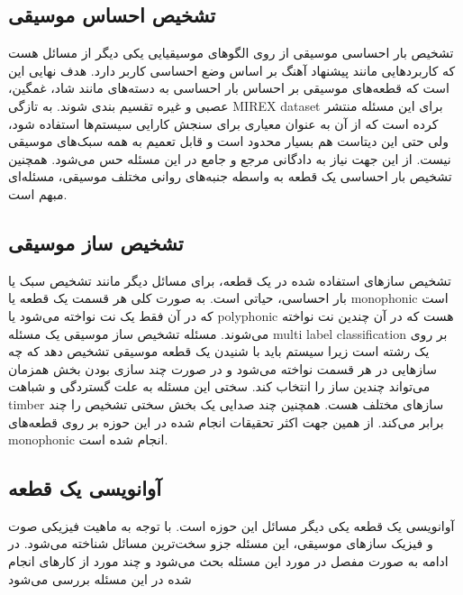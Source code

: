 \subsection{تشخیص احساس موسیقی}
تشخیص بار احساسی موسیقی از روی الگوهای موسیقیایی یکی دیگر از مسائل هست که
کاربردهایی مانند پیشنهاد آهنگ بر اساس وضع احساسی کاربر دارد. هدف نهایی این است
که قطعه‌های موسیقی بر احساس بار احساسی به دسته‌های مانند شاد، غمگین، عصبی و غیره
تقسیم بندی شوند. به تازگی MIREX \gls{dataset} برای این مسئله منتشر کرده است که از آن
به عنوان معیاری برای سنجش کارایی سیستم‌ها استفاده شود، ولی حتی این دیتاست هم
بسیار محدود است و قابل تعمیم به همه سبک‌های موسیقی نیست. از این جهت نیاز به
دادگانی مرجع و جامع در این مسئله حس می‌شود. همچنین تشخیص بار احساسی یک قطعه به
واسطه جنبه‌های روانی مختلف موسیقی، مسئله‌ای مبهم است.

\subsection{تشخیص ساز موسیقی}
تشخیص سازهای استفاده شده در یک قطعه، برای مسائل دیگر مانند تشخیص سبک یا بار
احساسی، حیاتی است. به صورت کلی هر قسمت یک قطعه یا \gls{monophonic} است که در آن
فقط یک نت نواخته می‌شود یا \gls{polyphonic} هست که در آن چندین نت نواخته
می‌شوند. مسئله تشخیص ساز موسیقی یک مسئله \gls{multi label classification} بر روی
یک رشته است زیرا سیستم باید با شنیدن یک قطعه موسیقی تشخیص دهد که چه سازهایی در
هر قسمت نواخته می‌شود و در صورت چند سازی بودن بخش همزمان می‌تواند چندین ساز را
انتخاب کند. سختی این مسئله به علت گستردگی و شباهت \gls{timber} سازهای مختلف هست.
همچنین چند صدایی یک بخش سختی تشخیص را چند برابر می‌کند. از همین جهت اکثر تحقیقات
انجام شده در این حوزه بر روی قطعه‌های \gls{monophonic} انجام شده است.

\subsection{آوانویسی یک قطعه}
آوانویسی یک قطعه یکی دیگر مسائل این حوزه است. با توجه به ماهیت فیزیکی صوت و
فیزیک سازهای موسیقی، این مسئله جزو سخت‌ترین مسائل شناخته می‌شود. در ادامه به
صورت مفصل در مورد این مسئله بحث می‌شود و چند مورد از کارهای انجام شده در این
مسئله بررسی می‌شود

